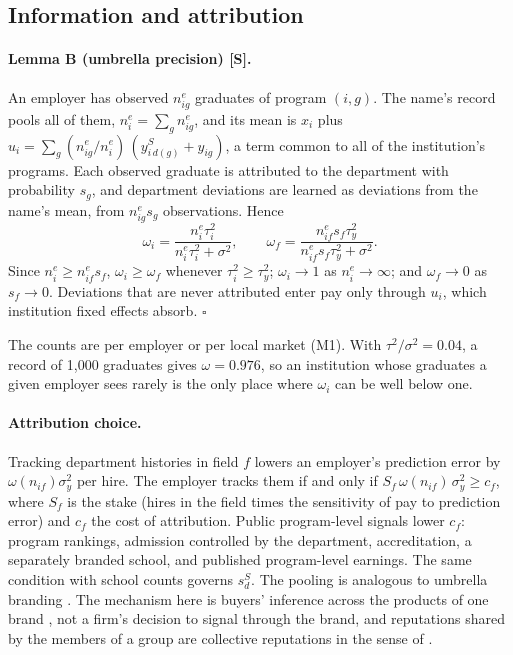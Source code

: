 \subsection{Information and attribution}\label{si:theory:attrib}

\paragraph{Lemma B (umbrella precision) [S].} An employer has observed $n^e_{ig}$ graduates of program $(i,g)$.
The name's record pools all of them, $n^e_i=\sum_gn^e_{ig}$, and its mean is $x_i$ plus
$u_i=\sum_g(n^e_{ig}/n^e_i)\,(y^S_{i\,d(g)}+y_{ig})$, a term common to all of the institution's programs. Each
observed graduate is attributed to the department with probability $s_g$, and department deviations are learned
as deviations from the name's mean, from $n^e_{ig}s_g$ observations. Hence
\[
\omega_i=\frac{n^e_i\tau_i^2}{n^e_i\tau_i^2+\sigma^2},\qquad
\omega_f=\frac{n^e_{if}s_f\tau_y^2}{n^e_{if}s_f\tau_y^2+\sigma^2}.
\]
Since $n^e_i\ge n^e_{if}s_f$, $\omega_i\ge\omega_f$ whenever $\tau_i^2\ge\tau_y^2$; $\omega_i\to1$ as
$n^e_i\to\infty$; and $\omega_f\to0$ as $s_f\to0$. Deviations that are never attributed enter pay only through
$u_i$, which institution fixed effects absorb. $\square$

The counts are per employer or per local market (M1). With $\tau^2/\sigma^2=0.04$, a record of 1,000 graduates
gives $\omega=0.976$, so an institution whose graduates a given employer sees rarely is the only place where
$\omega_i$ can be well below one.

\paragraph{Attribution choice.} Tracking department histories in field $f$ lowers an employer's prediction error
by $\omega(n_{if})\sigma_y^2$ per hire. The employer tracks them if and only if
$S_f\,\omega(n_{if})\,\sigma_y^2\ge c_f$, where $S_f$ is the stake (hires in the field times the sensitivity of pay
to prediction error) and $c_f$ the cost of attribution. Public program-level signals lower $c_f$: program
rankings, admission controlled by the department, accreditation, a separately branded school, and published
program-level earnings. The same condition with school counts governs $s^S_d$. The pooling is analogous to
umbrella branding \citep{wernerfelt1988umbrella}. The mechanism here is buyers' inference across the products of
one brand \citep{choi1998brand,cabral2000stretching}, not a firm's decision to signal through the brand, and
reputations shared by the members of a group are collective reputations in the sense of \citet{tirole1996theory}.

